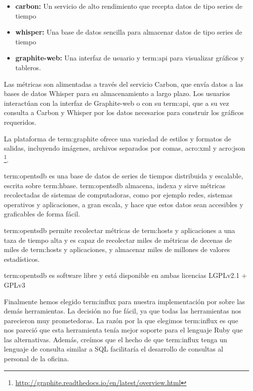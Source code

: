 \begin{itemize}

  \item \textbf{carbon:}
  Un servicio de alto rendimiento que recepta datos de tipo series de tiempo

  \item \textbf{whisper:}
  Una base de datos sencilla para almacenar datos de tipo series de tiempo

  \item \textbf{graphite-web:}
  Una interfaz de usuario y \gls{term:api} para visualizar gráficos y tableros.

\end{itemize}

Las métricas son alimentadas a través del servicio Carbon, que envía datos a
las bases de datos Whisper para su almacenamiento a largo plazo. Los usuarios
interactúan con la interfaz de Graphite-web o con su \gls{term:api}, que a su
vez consulta a Carbon y Whisper por los datos necesarios para construir los
gráficos requeridos.


La plataforma  de \gls{term:graphite} ofrece una variedad de estilos y
formatos de salidas, incluyendo imágenes, archivos separados por comas,
\gls{acro:xml} y \gls{acro:json}
\footnote{\url{http://graphite.readthedocs.io/en/latest/overview.html}}.

\gls{term:opentsdb} es una base de datos de series de tiempos distribuida y
escalable, escrita sobre \gls{term:hbase}. \gls{term:opentsdb} almacena, indexa
y sirve métricas recolectadas de sistemas de computadoras, como por ejemplo
redes, sistemas operativos y aplicaciones, a gran escala, y hace que estos
datos sean accesibles y graficables de forma fácil.

\gls{term:opentsdb} permite recolectar métricas de \glspl{term:host} y
aplicaciones a una taza de tiempo alta y es capaz de recolectar miles de
métricas de decenas de miles de \glspl{term:host} y aplicaciones, y almacenar
miles de millones de valores estadísticos.

\gls{term:opentsdb} es software libre y está disponible en ambas licencias
LGPLv2.1 + GPLv3~\cite{opentsdb}

Finalmente hemos elegido \gls{term:influx} para nuestra implementación por
sobre las demás herramientas. La decisión no fue fácil, ya que todas las
herramientas nos parecieron muy prometedoras. La razón por la que elegimos
\gls{term:influx} es que nos pareció que esta herramienta tenía mejor soporte
para el lenguaje Ruby que las alternativas. Además, creímos que el hecho de que
\gls{term:influx} tenga un lenguaje de consulta similar a SQL facilitaría el
desarrollo de consultas al personal de la oficina.

